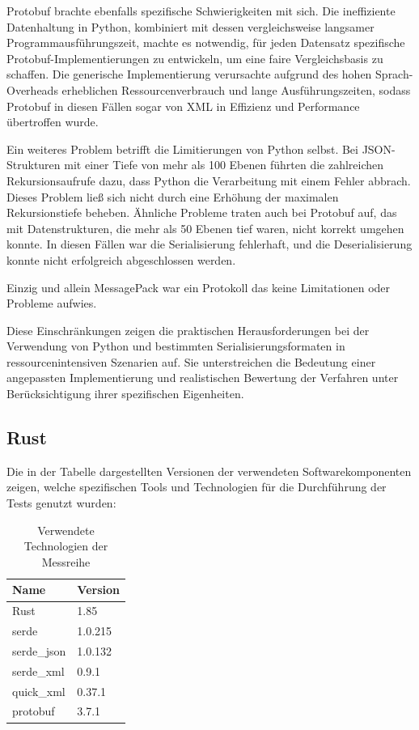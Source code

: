 \documentclass[ngerman]{seminarvorlage}
\begin{document}
Protobuf brachte ebenfalls spezifische Schwierigkeiten mit sich. Die ineffiziente Datenhaltung in Python, kombiniert mit dessen vergleichsweise langsamer Programmausführungszeit, machte es notwendig, für jeden Datensatz spezifische Protobuf-Implementierungen zu entwickeln, um eine faire Vergleichsbasis zu schaffen. Die generische Implementierung verursachte aufgrund des hohen Sprach-Overheads erheblichen Ressourcenverbrauch und lange Ausführungszeiten, sodass Protobuf in diesen Fällen sogar von XML in Effizienz und Performance übertroffen wurde.

Ein weiteres Problem betrifft die Limitierungen von Python selbst. Bei JSON-Strukturen mit einer Tiefe von mehr als 100 Ebenen führten die zahlreichen Rekursionsaufrufe dazu, dass Python die Verarbeitung mit einem Fehler abbrach. Dieses Problem ließ sich nicht durch eine Erhöhung der maximalen Rekursionstiefe beheben. Ähnliche Probleme traten auch bei Protobuf auf, das mit Datenstrukturen, die mehr als 50 Ebenen tief waren, nicht korrekt umgehen konnte. In diesen Fällen war die Serialisierung fehlerhaft, und die Deserialisierung konnte nicht erfolgreich abgeschlossen werden.

Einzig und allein MessagePack war ein Protokoll das keine Limitationen oder Probleme aufwies.

Diese Einschränkungen zeigen die praktischen Herausforderungen bei der Verwendung von Python und bestimmten Serialisierungsformaten in ressourcenintensiven Szenarien auf. Sie unterstreichen die Bedeutung einer angepassten Implementierung und realistischen Bewertung der Verfahren unter Berücksichtigung ihrer spezifischen Eigenheiten.

\subsection{Rust}

Die in der Tabelle dargestellten Versionen der verwendeten Softwarekomponenten zeigen, welche spezifischen Tools und Technologien für die Durchführung der Tests genutzt wurden:

\begin{table}[H]
    \centering
    \begin{tabular}{|l|l|}
    \hline
    \textbf{Name} & \textbf{Version} \\ \hline
    Rust          & 1.85             \\ \hline
    serde         & 1.0.215          \\ \hline
    serde\_json   & 1.0.132          \\ \hline
    serde\_xml    & 0.9.1            \\ \hline
    quick\_xml    & 0.37.1           \\ \hline
    protobuf      & 3.7.1            \\ \hline
    \end{tabular}
    \caption{Verwendete Technologien der Messreihe}
\end{table}
\end{document}
